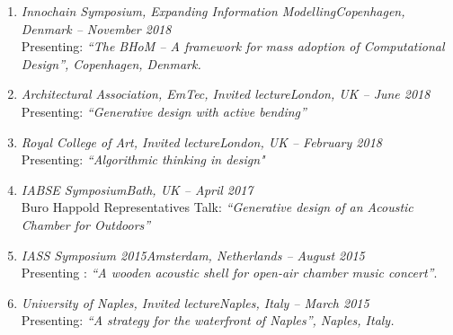 \begin{presentations}
    \begin{enumerate}[leftmargin=0.45cm, itemsep=0em, topsep=0.5em, parsep=0.2em]
        \item
        \emph{Innochain Symposium, Expanding Information Modelling}\hfill            \textit{Copenhagen, Denmark -- November 2018} \\
            Presenting: \textit{“The BHoM – A framework for mass adoption of Computational Design”, Copenhagen, Denmark.}

        \item \emph{Architectural Association, EmTec, Invited lecture}\hfill             \textit{London, UK -- June 2018} \\
            Presenting: \textit{“Generative design with active bending”}

        \item \emph{Royal College of Art, Invited lecture}\hfill \textit{London, UK -- February 2018} \\
            Presenting: \textit{“Algorithmic thinking in design"}

        \item \emph{IABSE Symposium}\hfill \textit{Bath, UK -- April 2017} \\
            Buro Happold Representatives Talk: \textit{“Generative design of an Acoustic Chamber for Outdoors”}

        \item \emph{IASS Symposium 2015}\hfill \textit{Amsterdam, Netherlands -- August 2015} \\
        Presenting : \textit{“A wooden acoustic shell for open-air chamber music concert”}.

        \item \emph{University of Naples, Invited lecture}\hfill \textit{Naples, Italy -- March 2015} \\
    	Presenting: \textit{“A strategy for the waterfront of Naples”, Naples, Italy.}

    \end{enumerate}
\end{presentations}